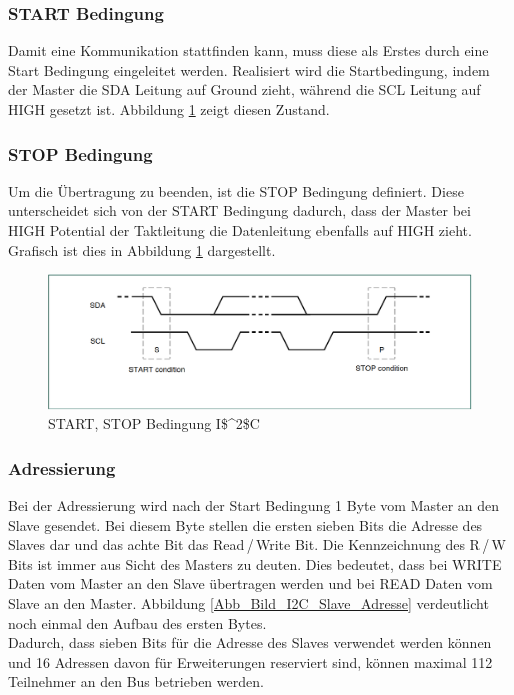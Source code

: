 \subsubsection*{START Bedingung}
\label{subsubsection_START_Bedingung}
Damit eine Kommunikation stattfinden kann, muss diese als Erstes durch eine Start Bedingung eingeleitet werden.  Realisiert wird die Startbedingung, indem der Master die SDA Leitung auf Ground zieht, während die SCL Leitung auf HIGH gesetzt ist. Abbildung \ref{Abb_Bild_I2C_START_STOP} zeigt diesen Zustand.

\subsubsection*{STOP Bedingung}
\label{subsubsection_STOP_Bedingung}
Um die Übertragung zu beenden, ist die STOP Bedingung definiert. Diese unterscheidet sich von der START Bedingung dadurch, dass der Master bei HIGH Potential der Taktleitung die Datenleitung ebenfalls auf HIGH zieht. Grafisch ist dies in Abbildung \ref{Abb_Bild_I2C_START_STOP} dargestellt.

\begin{figure}[!h] 
  \centering
     \includegraphics[scale=.65]{BilderAllgemein/I2C_START_STOP.png}
  \caption{START, STOP Bedingung \ac{I$^2$C}  \citep[S. 9]{I2C_Datenblatt}}
  \label{Abb_Bild_I2C_START_STOP}
\end{figure}

\subsubsection*{Adressierung}
\label{subsubsection_Adressierung}
Bei der Adressierung wird nach der Start Bedingung 1 Byte vom Master an den Slave gesendet. Bei diesem Byte stellen die ersten sieben Bits die Adresse des Slaves dar und das achte Bit das Read\,/\,Write Bit. Die Kennzeichnung des R\,/\,W Bits ist immer aus Sicht des Masters zu deuten. Dies bedeutet, dass bei WRITE Daten vom Master an den Slave übertragen werden und bei READ Daten vom Slave an den Master.
Abbildung \ref{Abb_Bild_I2C_Slave_Adresse} verdeutlicht noch einmal den Aufbau des ersten Bytes.\\ Dadurch, dass sieben Bits für die Adresse des Slaves verwendet werden können und 16 Adressen davon für Erweiterungen reserviert sind, können maximal 112 Teilnehmer  an den Bus betrieben werden.


